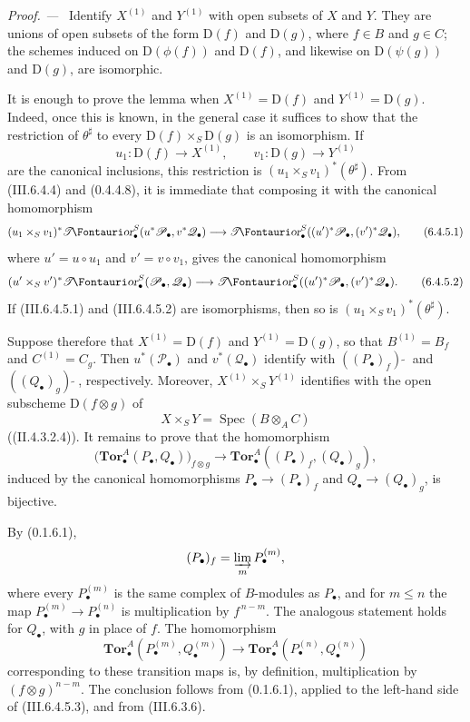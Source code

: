 \documentclass[10pt,oneside]{book}
\newcommand{\sh}[1]{\mathscr{#1}}
\newcommand{\shTor}{\sh{T}\textup{\kern-2.2pt{\Fontauri\slshape or}}}
\newcommand{\vphi}{\phi}
\newcommand{\supertilde}{{\,\widetilde{\,}\,}}
\newcommand{\Spec}{\operatorname{Spec}}
\newcommand{\sref}[2][]{(#2)}
\newcommand{\oldpage}[2][]{\setcounter{footnote}{0}\marginpar{\scriptsize\textbf{#1}~|~#2}\ignorespaces}
\newenvironment{proof}{\par\medskip\noindent\textit{Proof. ---\ }}{\par}
\begin{document}
\begin{proof}
Identify $X^{(1)}$ and $Y^{(1)}$ with open subsets of $X$ and $Y$.
They are unions of open subsets of the form $\mathrm D(f)$ and
$\mathrm D(g)$, where $f\in B$ and $g\in C$; the schemes induced
on $\mathrm D(\vphi(f))$ and $\mathrm D(f)$, and likewise on
$\mathrm D(\psi(g))$ and $\mathrm D(g)$, are isomorphic.

It is enough to prove the lemma when
$X^{(1)}=\mathrm D(f)$ and $Y^{(1)}=\mathrm D(g)$.  Indeed, once
this is known, in the general case it suffices to show that the
restriction of $\theta^\sharp$ to every
$\mathrm D(f)\times_S\mathrm D(g)$ is an isomorphism.  If
\[
  u_1:\mathrm D(f)\longrightarrow X^{(1)},
  \qquad
  v_1:\mathrm D(g)\longrightarrow Y^{(1)}
\]
are the canonical inclusions, this restriction is
$(u_1\times_Sv_1)^*(\theta^\sharp)$.  From
\sref{III.6.4.4} and \sref[0]{0.4.4.8}, it is immediate that
composing it with the canonical homomorphism
\[
  (u_1\times_Sv_1)^*
  \shTor_\bullet^S(u^*\sh P_\bullet,v^*\sh Q_\bullet)
  \longrightarrow
  \shTor_\bullet^S((u')^*\sh P_\bullet,(v')^*\sh Q_\bullet),
  \tag{6.4.5.1}\label{III.6.4.5.1}
\]
where $u'=u\circ u_1$ and $v'=v\circ v_1$, gives the canonical
homomorphism
\[
  (u'\times_Sv')^*
  \shTor_\bullet^S(\sh P_\bullet,\sh Q_\bullet)
  \longrightarrow
  \shTor_\bullet^S((u')^*\sh P_\bullet,(v')^*\sh Q_\bullet).
  \tag{6.4.5.2}\label{III.6.4.5.2}
\]
If \sref{III.6.4.5.1} and \sref{III.6.4.5.2} are isomorphisms,
then so is $(u_1\times_Sv_1)^*(\theta^\sharp)$.

Suppose therefore that $X^{(1)}=\mathrm D(f)$ and
$Y^{(1)}=\mathrm D(g)$, so that $B^{(1)}=B_f$ and
$C^{(1)}=C_g$.  Then $u^*(\sh P_\bullet)$ and
$v^*(\sh Q_\bullet)$ identify with
$((P_\bullet)_f)\supertilde$ and
$((Q_\bullet)_g)\supertilde$, respectively.  Moreover,
$X^{(1)}\times_SY^{(1)}$ identifies with the open subscheme
$\mathrm D(f\otimes g)$ of
\[
  X\times_SY=\Spec(B\otimes_AC)
\]
(\sref[II]{II.4.3.2.4}).  It remains to prove that the
homomorphism
\[
  \bigl(\mathbf{Tor}_\bullet^A(P_\bullet,Q_\bullet)\bigr)_{f\otimes g}
  \longrightarrow
  \mathbf{Tor}_\bullet^A((P_\bullet)_f,(Q_\bullet)_g),
  \tag{6.4.5.3}\label{III.6.4.5.3}
\]
\oldpage[III]{148}
induced by the canonical homomorphisms
$P_\bullet\longrightarrow(P_\bullet)_f$ and
$Q_\bullet\longrightarrow(Q_\bullet)_g$, is bijective.

By \sref[0]{0.1.6.1},
\[
  (P_\bullet)_f=\varinjlim_m P_\bullet^{(m)},
\]
where every $P_\bullet^{(m)}$ is the same complex of $B$-modules
as $P_\bullet$, and for $m\leq n$ the map
$P_\bullet^{(m)}\longrightarrow P_\bullet^{(n)}$ is
multiplication by $f^{\,n-m}$.  The analogous statement holds for
$Q_\bullet$, with $g$ in place of $f$.  The homomorphism
\[
  \mathbf{Tor}_\bullet^A(P_\bullet^{(m)},Q_\bullet^{(m)})
  \longrightarrow
  \mathbf{Tor}_\bullet^A(P_\bullet^{(n)},Q_\bullet^{(n)})
\]
corresponding to these transition maps is, by definition,
multiplication by $(f\otimes g)^{n-m}$.  The conclusion follows
from \sref[0]{0.1.6.1}, applied to the left-hand side of
\sref{III.6.4.5.3}, and from \sref{III.6.3.6}.
\end{proof}
\end{document}
